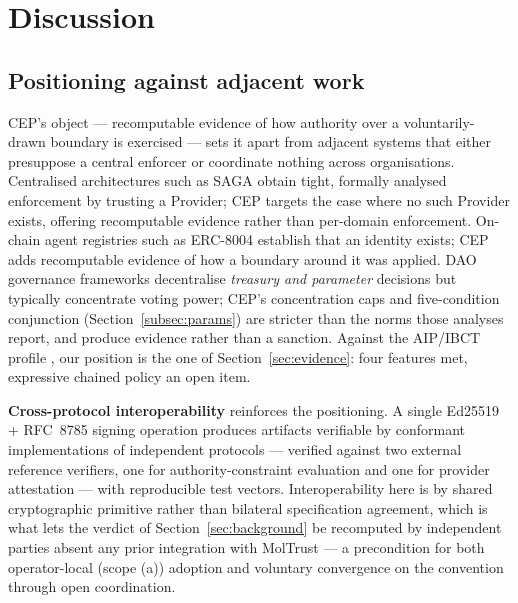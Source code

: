 \section{Discussion}
\label{sec:discussion}

\subsection{Positioning against adjacent work}

CEP's object — recomputable evidence of how authority over a voluntarily-drawn boundary is exercised — sets it apart from adjacent systems that either presuppose a central enforcer or coordinate nothing across organisations. Centralised architectures such as SAGA \cite{ref16_syros} obtain tight, formally analysed enforcement by trusting a Provider; CEP targets the case where no such Provider exists, offering recomputable evidence rather than per-domain enforcement. On-chain agent registries such as ERC-8004 \cite{ref37_erc8004} establish that an identity exists; CEP adds recomputable evidence of how a boundary around it was applied. DAO governance frameworks \cite{ref39_daogov} decentralise \emph{treasury and parameter} decisions but typically concentrate voting power; CEP's concentration caps and five-condition conjunction (Section~\ref{subsec:params}) are stricter than the norms those analyses report, and produce evidence rather than a sanction. Against the AIP/IBCT profile \cite{ref27_kroehlssrn}, our position is the one of Section~\ref{sec:evidence}: four features met, expressive chained policy an open item.

\textbf{Cross-protocol interoperability} reinforces the positioning. A single Ed25519 + RFC~8785 signing operation produces artifacts verifiable by conformant implementations of independent protocols — verified against two external reference verifiers, one for authority-constraint evaluation and one for provider attestation — with reproducible test vectors. Interoperability here is by shared cryptographic primitive rather than bilateral specification agreement, which is what lets the verdict of Section~\ref{sec:background} be recomputed by independent parties absent any prior integration with MolTrust — a precondition for both operator-local (scope (a)) adoption and voluntary convergence on the convention through open coordination.

